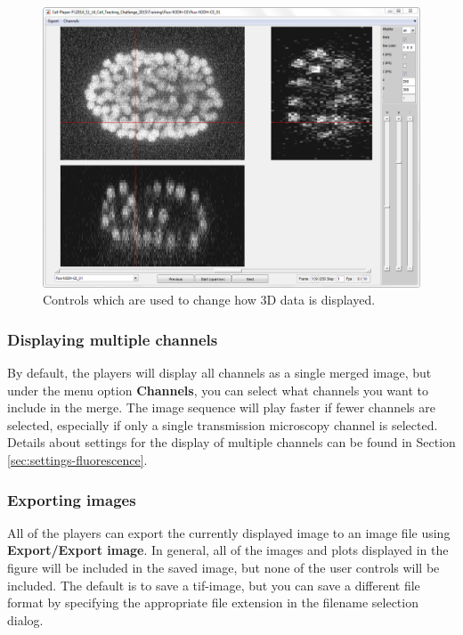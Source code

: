 \documentclass[a4paper, oneside, onecolumn, 11pt]{article}
\newcommand{\menu}[1]{\textbf{#1}}
\begin{document}
\begin{figure}[!ht]
\begin{center}
\includegraphics[width = \columnwidth]{figures/3Dplayers.png}
\caption{Controls which are used to change how 3D data is displayed.}
\label{fig:3D-players}
\end{center}
\end{figure}

\subsubsection{Displaying multiple channels}
By default, the players will display all channels as a single merged image, but under the menu option \menu{Channels}, you can select what channels you want to include in the merge. The image sequence will play faster if fewer channels are selected, especially if only a single transmission microscopy channel is selected. Details about settings for the display of multiple channels can be found in Section \ref{sec:settings-fluorescence}.

\subsubsection{Exporting images}
\label{sec:export-image}
All of the players can export the currently displayed image to an image file using \menu{Export/\allowbreak Export image}. In general, all of the images and plots displayed in the figure will be included in the saved image, but none of the user controls will be included. The default is to save a tif-image, but you can save a different file format by specifying the appropriate file extension in the filename selection dialog.
\end{document}
